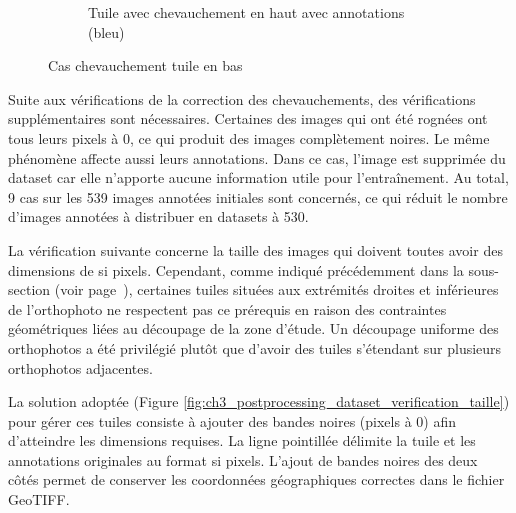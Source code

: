 \begin{figure}[H]
\begin{subfigure}[b]{0.49\textwidth}
        \caption{Tuile avec chevauchement en haut avec annotations (bleu)}
        \label{fig:ch3_postprocessing_dataset_15_validation_chevauchement_bas4}
    \end{subfigure}
    
    \caption{Cas chevauchement tuile en bas}
    \label{fig:exemple_post_traitement_validation_tuile_bas}
\end{figure}

Suite aux vérifications de la correction des chevauchements, des vérifications supplémentaires sont nécessaires. Certaines des images qui ont été rognées ont tous leurs pixels à 0, ce qui produit des images complètement noires. Le même phénomène affecte aussi leurs annotations. Dans ce cas, l'image est supprimée du dataset car elle n'apporte aucune information utile pour l'entraînement. Au total, 9 cas sur les 539 images annotées initiales sont concernés, ce qui réduit le nombre d'images annotées à distribuer en datasets à 530.

La vérification suivante concerne la taille des images qui doivent toutes avoir des dimensions de si{} pixels. Cependant, comme indiqué précédemment dans la sous-section \textit{} (voir page~\pageref{subsubsec:decoupe_orthophoto_tuile}), certaines tuiles situées aux extrémités droites et inférieures de l'orthophoto ne respectent pas ce prérequis en raison des contraintes géométriques liées au découpage de la zone d'étude. Un découpage uniforme des orthophotos a été privilégié plutôt que d'avoir des tuiles s'étendant sur plusieurs orthophotos adjacentes.

La solution adoptée (Figure \ref{fig:ch3_postprocessing_dataset_verification_taille}) pour gérer ces tuiles consiste à ajouter des bandes noires (pixels à 0) afin d'atteindre les dimensions requises. La ligne pointillée délimite la tuile et les annotations originales au format si{} pixels. L'ajout de bandes noires des deux côtés permet de conserver les coordonnées géographiques correctes dans le fichier GeoTIFF.

